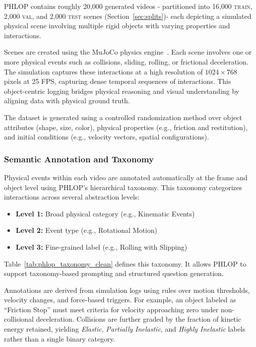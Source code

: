 \documentclass[conference]{IEEEtran}
\begin{document}
PHLOP contains roughly 20{,}000 generated videos - partitioned into 16{,}000 \textsc{train}, 2{,}000 \textsc{val}, and 2{,}000 \textsc{test} scenes (Section~\ref{sec:splits})- each depicting a simulated physical scene involving multiple rigid objects with varying properties and interactions.

Scenes are created using the MuJoCo physics engine~\cite{todorov2012mujoco}. Each scene involves one or more physical events such as collisions, sliding, rolling, or frictional deceleration. The simulation captures these interactions at a high resolution of $1024 \times 768$ pixels at 25 FPS, capturing dense temporal sequences of interactions. This object-centric logging bridges physical reasoning and visual understanding by aligning data with physical ground truth.

The dataset is generated using a controlled randomization method over object attributes (shape, size, color), physical properties (e.g., friction and restitution), and initial conditions (e.g., velocity vectors, spatial configurations). 

\subsubsection{Semantic Annotation and Taxonomy}

Physical events within each video are annotated automatically at the frame and object level using PHLOP’s hierarchical taxonomy. This taxonomy categorizes interactions across several abstraction levels:
\begin{itemize}
    \item \textbf{Level 1:} Broad physical category (e.g., Kinematic Events)
    \item \textbf{Level 2:} Event type (e.g., Rotational Motion)
    \item \textbf{Level 3:} Fine-grained label (e.g., Rolling with Slipping)
\end{itemize}


Table~\ref{tab:phlop_taxonomy_clean} defines this taxonomy. It allows PHLOP to support taxonomy-based prompting and structured question generation.


Annotations are derived from simulation logs using rules over motion thresholds, velocity changes, and force-based triggers. For example, an object labeled as ``Friction Stop'' must meet criteria for velocity approaching zero under non-collisional deceleration. Collisions are further graded by the fraction of kinetic energy retained, yielding \textit{Elastic}, \textit{Partially Inelastic}, and \textit{Highly Inelastic} labels rather than a single binary category.
\end{document}
